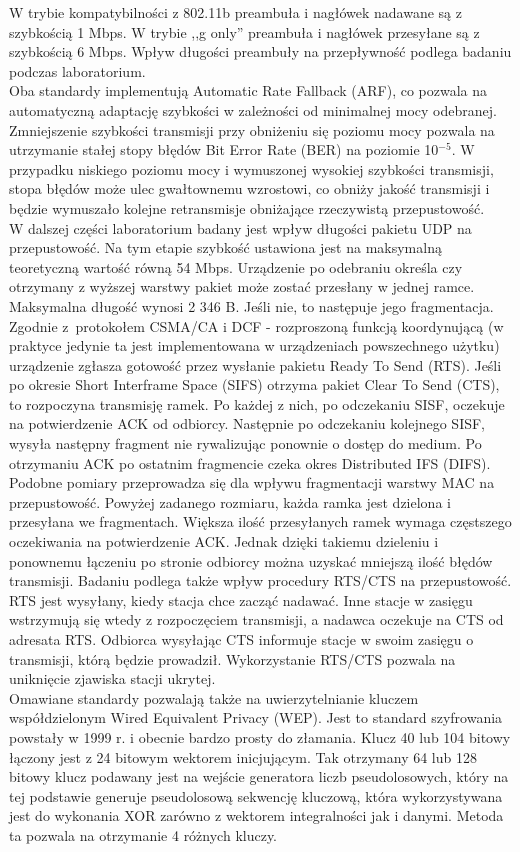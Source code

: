 \documentclass[12pt, a4paper, oneside]{article}
\begin{document}
\indent W trybie kompatybilności z 802.11b preambuła i nagłówek nadawane są z szybkością 1 Mbps. W trybie ,,g only'' preambuła i nagłówek przesyłane są z szybkością 6 Mbps. Wpływ długości preambuły na przepływność podlega badaniu podczas laboratorium.\\
\indent Oba standardy implementują Automatic Rate Fallback (ARF), co pozwala na automatyczną adaptację szybkości w zależności od minimalnej mocy odebranej. Zmniejszenie szybkości transmisji przy obniżeniu się poziomu mocy pozwala na utrzymanie stałej stopy błędów Bit Error Rate (BER) na poziomie 10$^{-5}$. W przypadku niskiego poziomu mocy i wymuszonej wysokiej szybkości transmisji, stopa błędów może ulec gwałtownemu wzrostowi, co obniży jakość transmisji i będzie wymuszało kolejne retransmisje obniżające rzeczywistą przepustowość.\\
\indent W dalszej części laboratorium badany jest wpływ długości pakietu UDP na przepustowość. Na tym etapie szybkość ustawiona jest na maksymalną teoretyczną wartość równą 54 Mbps. Urządzenie po odebraniu określa czy otrzymany z wyższej warstwy pakiet może zostać przesłany w jednej ramce. Maksymalna długość wynosi 2 346 B. Jeśli nie, to następuje jego fragmentacja. Zgodnie z~protokołem CSMA/CA i DCF - rozproszoną funkcją koordynującą (w praktyce jedynie ta jest implementowana w urządzeniach powszechnego użytku) urządzenie zgłasza gotowość przez wysłanie pakietu Ready To Send (RTS). Jeśli po okresie Short Interframe Space (SIFS) otrzyma pakiet Clear To Send (CTS), to rozpoczyna transmisję ramek. Po każdej z nich, po odczekaniu SISF, oczekuje na potwierdzenie ACK od odbiorcy. Następnie po odczekaniu kolejnego SISF, wysyła następny fragment nie rywalizując ponownie o dostęp do medium. Po otrzymaniu ACK po ostatnim fragmencie czeka okres Distributed IFS (DIFS).\\
\indent Podobne pomiary przeprowadza się dla wpływu fragmentacji warstwy MAC na przepustowość. Powyżej zadanego rozmiaru, każda ramka jest dzielona i przesyłana we fragmentach. Większa ilość przesyłanych ramek wymaga częstszego oczekiwania na potwierdzenie ACK. Jednak dzięki takiemu dzieleniu i ponownemu łączeniu po stronie odbiorcy można uzyskać mniejszą ilość błędów transmisji.
\indent Badaniu podlega także wpływ procedury RTS/CTS na przepustowość. RTS jest wysyłany, kiedy stacja chce zacząć nadawać. Inne stacje w zasięgu wstrzymują się wtedy z rozpoczęciem transmisji, a nadawca oczekuje na CTS od adresata RTS. Odbiorca wysyłając CTS informuje stacje w swoim zasięgu o transmisji, którą będzie prowadził. Wykorzystanie RTS/CTS pozwala na uniknięcie zjawiska stacji ukrytej.\\
\indent Omawiane standardy pozwalają także na uwierzytelnianie kluczem współdzielonym Wired Equivalent Privacy (WEP). Jest to standard szyfrowania powstały w 1999 r. i obecnie bardzo prosty do złamania. Klucz 40 lub 104 bitowy łączony jest z 24 bitowym wektorem inicjującym. Tak otrzymany 64 lub 128 bitowy klucz podawany jest na wejście generatora liczb pseudolosowych, który na tej podstawie generuje pseudolosową sekwencję kluczową, która wykorzystywana jest do wykonania XOR zarówno z wektorem integralności jak i danymi. Metoda ta pozwala na otrzymanie 4 różnych kluczy.
\end{document}
